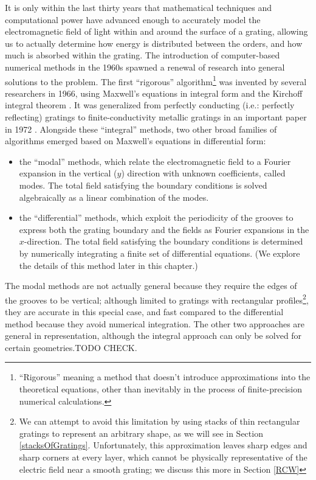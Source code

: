 It is only within the last thirty years that mathematical techniques and computational power have advanced enough to accurately model the electromagnetic field of light within and around the surface of a grating, allowing us to actually determine how energy is distributed between the orders, and how much is absorbed within the grating.    The introduction of computer-based numerical methods in the 1960s spawned a renewal of research into general solutions to the problem.  The first ``rigorous'' algorithm\footnote{``Rigorous'' meaning a method that doesn't introduce approximations into the theoretical equations, other than inevitably in the process of finite-precision numerical calculations.} was invented by several researchers in 1966, using Maxwell's equations in integral form and the Kirchoff integral theorem \cite{Pet66}\cite{Wir69}\cite{Pav70}.  It was generalized from perfectly conducting (i.e.: perfectly reflecting) gratings to finite-conductivity metallic gratings in an important paper in 1972 \cite{May72}.  Alongside these ``integral'' methods, two other broad families of algorithms emerged based on Maxwell's equations in differential form:
\begin{itemize}
\item the ``modal'' methods, which relate the electromagnetic field to a Fourier expansion in the vertical ($y$) direction with unknown coefficients, called modes. The total field satisfying the boundary conditions is solved algebraically as a linear combination of the modes. \cite{Bot81}\cite{Bot81a}\cite{And81}
\item the ``differential'' methods, which exploit the periodicity of the grooves to express both the grating boundary and the fields as Fourier expansions in the $x$-direction. The total field satisfying the boundary conditions is determined by numerically integrating a finite set of differential equations. (We explore the details of this method later in this chapter.)
\end{itemize}
The modal methods are not actually general because they require the edges of the grooves to be vertical; although limited to gratings with rectangular profiles\footnote{We can attempt to avoid this limitation by using stacks of thin rectangular gratings to represent an arbitrary shape, as we will see in Section \ref{stacksOfGratings}.  Unfortunately, this approximation leaves sharp edges and sharp corners at every layer, which cannot be physically representative of the electric field near a smooth grating; we discuss this more in Section \ref{RCW}}, they are accurate in this special case, and fast compared to the differential method because they avoid numerical integration.  The other two approaches are general in representation, although the integral approach can only be solved for certain geometries.TODO CHECK.

